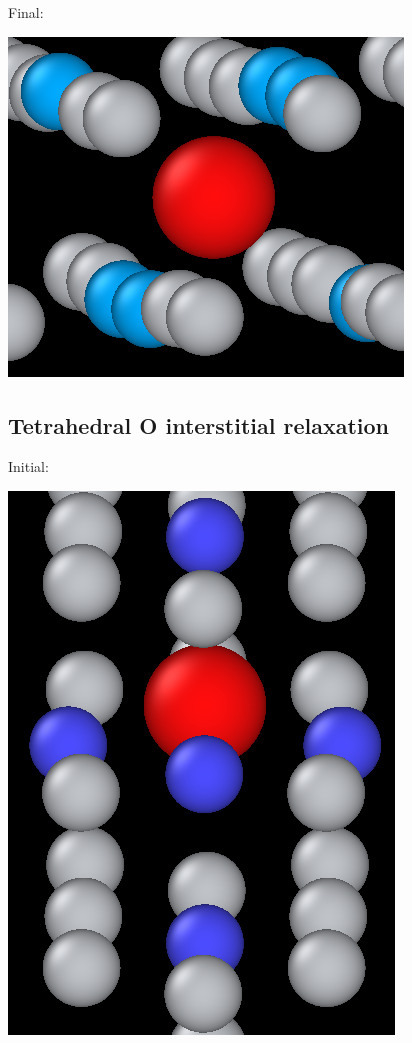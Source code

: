 \documentclass[11pt]{article}
\begin{document}
Final:
\begin{center}
\includegraphics[width=.9\linewidth]{Images/final_octahedral_ox_ovito.png}
\end{center}

\subsection{Tetrahedral O interstitial relaxation}
\label{sec:org59035ea}

Initial:
\begin{center}
\includegraphics[width=.9\linewidth]{Images/final_model_final_tetra_ox.png}
\end{center}
\end{document}
